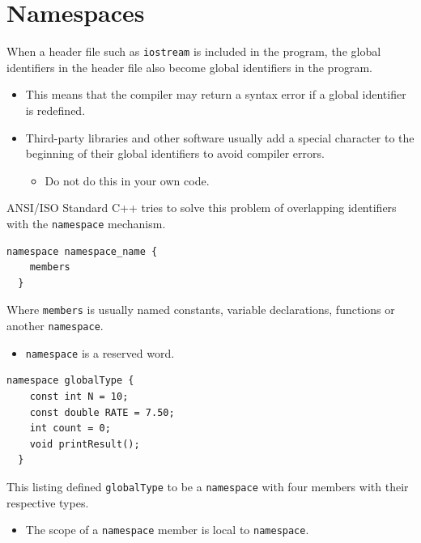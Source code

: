 \documentclass{article}
\begin{document}
\section{Namespaces}
When a header file such as \texttt{iostream} is included in the program, the
global identifiers in the header file also become global identifiers in the
program.

\begin{itemize}
  \item This means that the compiler may return a syntax error if a global
    identifier is redefined.
  \item Third-party libraries and other software usually add a special character
    to the beginning of their global identifiers to avoid compiler errors.
    \begin{itemize}
      \item Do not do this in your own code.
    \end{itemize}
\end{itemize}

ANSI/ISO Standard C++ tries to solve this problem of overlapping identifiers
with the \texttt{namespace} mechanism.

\begin{lstlisting}[caption={\texttt{namespace} Statement Syntax}]
  namespace namespace_name {
    members
  }
\end{lstlisting}

Where \texttt{members} is usually named constants, variable declarations,
functions or another \texttt{namespace}.

\begin{itemize}
  \item \texttt{namespace} is a reserved word.
\end{itemize}

\begin{lstlisting}[caption={\texttt{namespace} Example}]
  namespace globalType {
    const int N = 10;
    const double RATE = 7.50;
    int count = 0;
    void printResult();
  }
\end{lstlisting}

This listing defined \texttt{globalType} to be a \texttt{namespace} with four
members with their respective types.

\begin{itemize}
  \item The scope of a \texttt{namespace} member is local to \texttt{namespace}.
\end{itemize}
\end{document}

